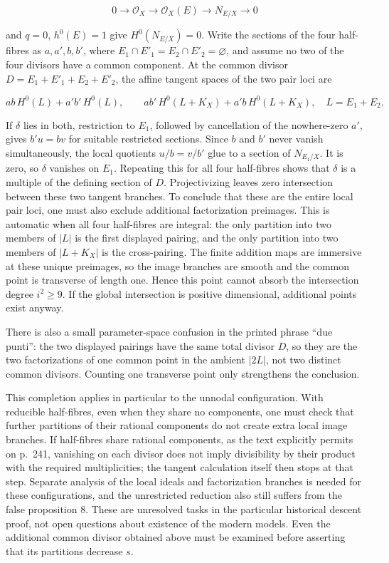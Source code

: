 \[
0\longrightarrow\mathcal O_X\longrightarrow\mathcal O_X(E)
\longrightarrow N_{E/X}\longrightarrow0
\]

and \(q=0\), \(h^0(E)=1\) give \(H^0(N_{E/X})=0\). Write the sections of the four half-fibres as \(a,a',b,b'\), where \(E_1\cap E'_1=E_2\cap E'_2=\varnothing\), and assume no two of the four divisors have a common component. At the common divisor \(D=E_1+E'_1+E_2+E'_2\), the affine tangent spaces of the two pair loci are

\[
 ab\,H^0(L)+a'b'\,H^0(L),\qquad
 ab'\,H^0(L+K_X)+a'b\,H^0(L+K_X),
 \quad L=E_1+E_2.
\]

If \(\delta\) lies in both, restriction to \(E_1\), followed by cancellation of the nowhere-zero \(a'\), gives \(b'u=bv\) for suitable restricted sections. Since \(b\) and \(b'\) never vanish simultaneously, the local quotients \(u/b=v/b'\) glue to a section of \(N_{E_1/X}\). It is zero, so \(\delta\) vanishes on \(E_1\). Repeating this for all four half-fibres shows that \(\delta\) is a multiple of the defining section of \(D\). Projectivizing leaves zero intersection between these two tangent branches. To conclude that these are the entire local pair loci, one must also exclude additional factorization preimages. This is automatic when all four half-fibres are integral: the only partition into two members of \(\vert L\vert \) is the first displayed pairing, and the only partition into two members of \(\vert L+K_X\vert \) is the cross-pairing. The finite addition maps are immersive at these unique preimages, so the image branches are smooth and the common point is transverse of length one. Hence this point cannot absorb the intersection degree \(i^2\ge9\). If the global intersection is positive dimensional, additional points exist anyway.

There is also a small parameter-space confusion in the printed phrase ``due punti'': the two displayed pairings have the same total divisor \(D\), so they are the two factorizations of one common point in the ambient \(\vert 2L\vert \), not two distinct common divisors. Counting one transverse point only strengthens the conclusion.

This completion applies in particular to the unnodal configuration. With reducible half-fibres, even when they share no components, one must check that further partitions of their rational components do not create extra local image branches. If half-fibres share rational components, as the text explicitly permits on p.~241, vanishing on each divisor does not imply divisibility by their product with the required multiplicities; the tangent calculation itself then stops at that step. Separate analysis of the local ideals and factorization branches is needed for these configurations, and the unrestricted reduction also still suffers from the false proposition 8. These are unresolved tasks in the particular historical descent proof, not open questions about existence of the modern models. Even the additional common divisor obtained above must be examined before asserting that its partitions decrease \(s\).

